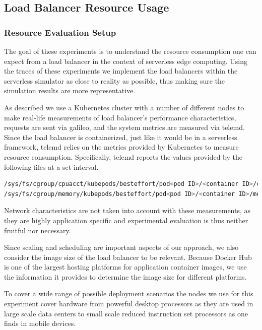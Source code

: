 \subsection{Load Balancer Resource Usage}
\subsubsection{Resource Evaluation Setup}
The goal of these experiments is to understand the resource consumption one can expect from a load balancer in the context of serverless edge computing.
Using the traces of these experiments we implement the load balancers within the serverless simulator as close to reality as possible, thus making sure the simulation results are more representative.

As described we use a Kubernetes cluster with a number of different nodes to make real-life measurements of load balancer's performance characteristics, requests are sent via galileo\cite{galileo-github}\cite{operating-energy-aware-galileo}, and the system metrics are measured via telemd\cite{telemd-github}.
Since the load balancer is containerized, just like it would be in a serverless framework, telemd relies on the metrics provided by Kubernetes to measure resource consumption.
Specifically, telemd reports the values provided by the following files at a set interval\cite{telemd-github}.
\begin{lstlisting}[language=Bash]
/sys/fs/cgroup/cpuacct/kubepods/besteffort/pod<pod ID>/<container ID>/cpuacct.usage
/sys/fs/cgroup/memory/kubepods/besteffort/pod<pod ID>/<container ID>/memory.stat
\end{lstlisting}
Network characteristics are not taken into account with these measurements, as they are highly application specific and experimental evaluation is thus neither fruitful nor necessary.

Since scaling and scheduling are important aspects of our approach, we also consider the image size of the load balancer to be relevant.
Because Docker Hub is one of the largest hosting platforms for application container images, we use the information it provides\cite{traefik-dockerhub} to determine the image size for different platforms.

To cover a wide range of possible deployment scenarios the nodes we use for this experiment cover hardware from powerful desktop processors as they are used in large scale data centers to small scale reduced instruction set processors as one finds in mobile devices.

